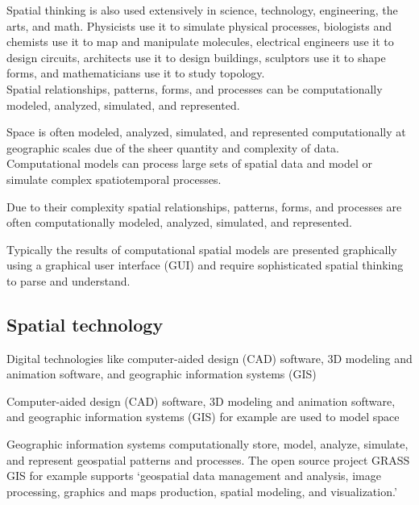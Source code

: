Spatial thinking is also used extensively in science, technology, engineering, the arts, and math. 
Physicists use it to simulate physical processes,
biologists and chemists use it to map and manipulate molecules,
electrical engineers use it to design circuits, 
architects use it to design buildings, 
sculptors use it to shape forms, 
and mathematicians use it to study topology. \\

Spatial relationships, patterns, forms, and processes can be computationally modeled, analyzed, simulated, and represented. 

Space is often modeled, analyzed, simulated, and represented computationally at geographic scales
due of the sheer quantity and complexity of data. 
Computational models can process large sets of spatial data and model or simulate complex spatiotemporal processes.


Due to their complexity spatial relationships, patterns, forms, and processes are often computationally modeled, analyzed, simulated, and represented. 

Typically the results of computational spatial models are presented graphically using a graphical user interface (GUI) and require sophisticated spatial thinking to parse and understand. 

%
\subsection{Spatial technology}

Digital technologies like computer-aided design (CAD) software, 3D modeling and animation software, and geographic information systems (GIS)

Computer-aided design (CAD) software, 3D modeling and animation software, and geographic information systems (GIS) for example are used to model space

Geographic information systems computationally store, model, analyze, simulate, and represent geospatial patterns and processes. 
%
The open source project GRASS GIS for example supports 
`geospatial data management and analysis, image processing, graphics and maps production, spatial modeling, and visualization.'


